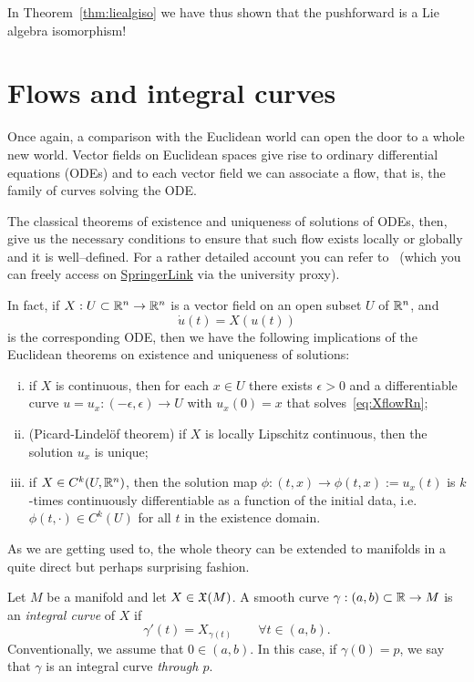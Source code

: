 In Theorem~\ref{thm:liealgiso} we have thus shown that the pushforward is a Lie algebra isomorphism!

\section{Flows and integral curves}

Once again, a comparison with the Euclidean world can open the door to a whole new world.
Vector fields on Euclidean spaces give rise to ordinary differential equations (ODEs) and to each vector field we can associate a flow, that is, the family of curves solving the ODE.

The classical theorems of existence and uniqueness of solutions of ODEs, then, give us the necessary conditions to ensure that such flow exists locally or globally and it is well--defined.
For a rather detailed account you can refer to~\cite[Chapters 3.2 and 3.3]{book:knauf} (which you can freely access on \href{https://link.springer.com/book/10.1007\%2F978-3-662-55774-7}{SpringerLink} via the university proxy).

In fact, if $X: U\subset\mathbb{R}^n \to \mathbb{R}^n$ is a vector field on an open subset $U$ of $\mathbb{R}^n$, and
\begin{equation}\label{eq:XflowRn}
	\dot u(t) = X(u(t))
\end{equation}
is the corresponding ODE, then we have the following implications of the Euclidean theorems on existence and uniqueness of solutions:
\begin{enumerate}[(i)]
	\item if $X$ is continuous, then for each $x\in U$ there exists $\epsilon > 0$ and a differentiable curve $u = u_{x} : (-\epsilon, \epsilon) \to U$ with $u_x(0) = x$ that solves~\eqref{eq:XflowRn};
	\item (Picard-Lindel\"of theorem) if $X$ is locally Lipschitz continuous, then the solution $u_x$ is unique;
	\item if $X\in C^k(U,\mathbb{R}^n)$, then the solution map $\phi : (t, x) \to \phi(t, x) := u_x (t)$ is $k$-times continuously differentiable as a function of the initial data, i.e. $\phi(t, \cdot)\in C^k(U)$ for all $t$ in the existence domain.
\end{enumerate}

As we are getting used to, the whole theory can be extended to manifolds in a quite direct but perhaps surprising fashion.

\begin{definition}
	Let $M$ be a manifold and let $X\in\mathfrak{X}(M)$.
	A smooth curve $\gamma: (a,b)\subset\mathbb{R} \to M$ is an \emph{integral curve} of $X$ if
	\begin{equation}\label{eq:integralCurve}
		\gamma'(t) = X_{\gamma(t)} \qquad \forall t\in(a,b).
	\end{equation}
	Conventionally, we assume that $0\in(a,b)$. In this case, if $\gamma(0)=p$, we say that $\gamma$ is an integral curve \emph{through $p$}.
\end{definition}

